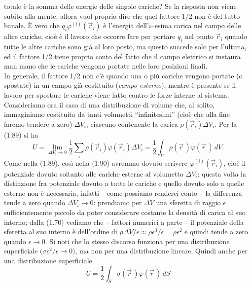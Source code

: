 totale \`e la somma delle energie delle singole cariche? Se la risposta non
viene subito alla mente, allora vuol proprio dire che quel fattore 1/2 non \`e
del tutto banale. \`E vero che $q_i\varphi^{(i)}(\vec r_i)$ \`e l'energia
dell'$i$--esima carica nel campo delle altre cariche, cio\`e \`e il lavoro che
occorre fare per portare $q_i$ nel punto $\vec r_i$ quando \underline{tutte} le
altre cariche sono gi\`a al loro posto, ma questo succede solo per l'ultima, ed
il fattore 1/2 tiene proprio conto del fatto che il campo elettrico si instaura
man mano che le cariche vengono portate nelle loro posizioni finali.\\
In generale, il fattore 1/2 non c'\`e quando una o pi\`u cariche vengono portate
(o spostate) in un campo gi\`a costituito (\emph{campo esterno}), mentre \`e
presente se il lavoro per spostare le cariche viene fatto contro le forze
interne al sistema.\\
Consideriamo ora il caso di una distribuzione di volume che, al solito,
immaginiamo costituita da tanti volumetti ``infinitesimi'' (cio\`e che alla fine
faremo tendere a zero) $\Delta V_i$, ciascuno contenente la carica
$\rho(\vec r_i)\Delta V_i$. Per la (1.89) si ha
\begin{equation}
  U=\lim_{\Delta V_i\to0}\frac12\sum_i\rho(\vec r_i)\varphi(\vec r_i)\Delta V_i
  =\frac12\int_V\rho(\vec r\,)\varphi(\vec r\,)\,dV.
  \tag{1.90}
\end{equation}
Come nella (1.89), cos\`i nella (1.90) avremmo dovuto scrivere
$\varphi^{(i)}(\vec r_i)$, cio\`e il potenziale dovuto soltanto alle cariche
esterne al volumetto $\Delta V_i$: questa volta la distinzione fra potenziale
dovuto a tutte le cariche e quello dovuto solo a quelle esterne non \`e
necessaria, infatti -- come possiamo renderci conto -- la differenza tende a
zero quando $\Delta V_i\to0$: prendiamo per $\Delta V$ una sferetta di raggio
$\epsilon$ sufficientemente piccolo da poter considerare costante la densit\`a
di carica al suo interno; dalla (1.70) vediamo che -- fattori numerici a parte
-- il potenziale della sferetta al suo interno \`e dell'ordine di
$\rho\Delta V/\epsilon\approx\rho\epsilon^3/\epsilon=\rho\epsilon^2$ e quindi
tende a zero quando $\epsilon\to0$. Si noti che lo stesso discorso funziona per
una distribuzione superficiale $\big(\sigma\epsilon^2/\epsilon\to0\big)$, ma non
per una distribuzione lineare. Quindi anche per una distribuzione superficiale
\begin{equation}
  U=\frac12\int_S\sigma(\vec r\,)\varphi(\vec r\,)\,dS
  \tag{1.91}
\end{equation}
